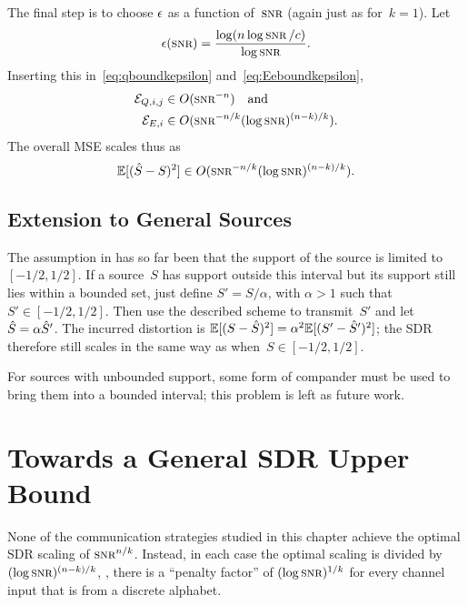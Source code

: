 The final step is to choose $\epsilon$ as a function of~$\snr$ (again just as
for~$k=1$). Let
\begin{equation*}
  \e(\snr) = \frac{\log(n \log\snr / c)}{\log\snr}.
\end{equation*}
Inserting this in~\eqref{eq:qboundkepsilon} and~\eqref{eq:Eeboundkepsilon}, 
\begin{align*}
  \Err_{Q,i,j} &\in O(\snr^{-n}) \quad\text{and} \\
  \Err_{E,i} &\in O(\snr^{-n/k} (\log\snr)^{(n-k)/k}).
\end{align*}
The overall MSE scales thus as
\begin{equation*}
  \mse \in O(\snr^{-n/k} (\log\snr)^{(n-k)/k}).
\end{equation*}


\subsection{Extension to General Sources}\label{sec:extgensources}

The assumption in  has so far been that the support of the
source is limited to~$[-1/2,1/2]$. If a source~$S$ has support outside this
interval but its support still lies within a bounded set, just define $S' =
S/\alpha$, with $\alpha > 1$ such that $S' \in [-1/2, 1/2]$. Then use
the described scheme to transmit~$S'$ and let ${\hat{S}} = \alpha {\hat{S}}'$. The
incurred distortion is $\mathbb{E}[(S - {\hat{S}})^2] = \alpha^2 \mathbb{E}[(S' - {\hat{S}}')^2]$; the SDR
therefore still scales in the same way as when~$S \in [-1/2, 1/2]$.

For sources with unbounded support, some form of compander must be used to bring
them into a bounded interval; this problem is left as future work. 







\section{Towards a General SDR Upper Bound}\label{sec:gensdrub}

None of the communication strategies studied in this chapter achieve the optimal
SDR scaling of  $\snr^{n/k}$. Instead, in each case the optimal scaling is
divided by $(\log\snr)^{(n-k)/k}$, \ie, there is a ``penalty factor'' of
$(\log\snr)^{1/k}$ for every channel input that is from a discrete alphabet.

